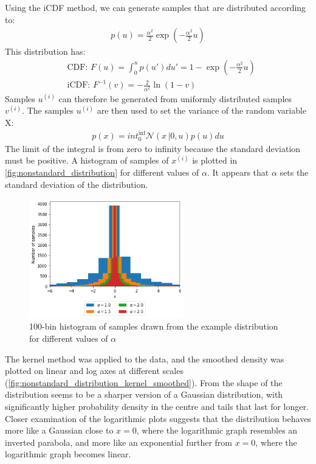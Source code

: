 \documentclass[a4paper]{article}
\begin{document}
Using the iCDF method, we can generate samples that are distributed according to:
\begin{align*}
    p(u) = \frac{\alpha^2}{2} \exp\left(-\frac{\alpha^2}{2} u\right)
\end{align*}
This distribution has:
\begin{align*}
    & \text{CDF: } F(u) = \int_0^u p(u') du' = 1 - \exp\left(-\frac{\alpha^2}{2} u\right) \\
    & \text{iCDF: } F^{-1}(v) = -\frac{2}{\alpha^2} \ln(1 - v)
\end{align*}
Samples $u^{(i)}$ can therefore be generated from uniformly distributed samples $v^(i)$.
The samples $u^{(i)}$ are then used to set the variance of the random variable X:
\begin{align*}
    p(x) = int_{0}^{\inf} \mathcal{N}(x\,|0, u) p(u) du
\end{align*}
The limit of the integral is from zero to infinity because the standard deviation must be positive.
A histogram of samples of $x^{(i)}$ is plotted in \autoref{fig:nonstandard_distribution} for different values of
$\alpha$. It appears that $\alpha$ sets the standard deviation of the distribution.
\begin{figure}[h]
\centering
\includegraphics[width=0.6\textwidth]{figures/nonstandard_distribution.png}
\caption{100-bin histogram of samples drawn from the example distribution for different values of $\alpha$}
\label{fig:nonstandard_distribution}
\end{figure}

The kernel method was applied to the data, and the smoothed density was plotted on linear and log axes at different
scales (\autoref{fig:nonstandard_distribution_kernel_smoothed}). From the shape of the distribution
seems to be a sharper version of a Gaussian distribution, with significantly higher probability density in the centre
and tails that last for longer. Closer examination of the logarithmic plots suggests that the distribution behaves
more like a Gaussian close to $x=0$, where the logarithmic graph resembles an inverted parabola, and more like an
exponential further from $x=0$, where the logarithmic graph becomes linear.
\end{document}
